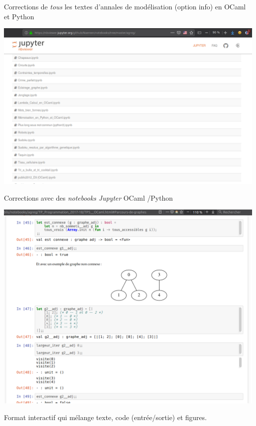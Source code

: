 \documentclass[11pt,english,ignorenonframetext,]{beamer}
\begin{document}
\begin{frame}[plain]{Corrections de \emph{tous} les textes d'annales de modélisation (\textcolor{info}{option info}) en OCaml et Python}

\centering
\includegraphics{figures/apercu_ENS_agreg_1.png}

\end{frame}

\begin{frame}[plain]{Corrections avec des \emph{notebooks Jupyter} OCaml /Python}

\centering
\includegraphics{figures/apercu_ENS_agreg_3.png}

Format interactif qui mélange texte, code (entrée/sortie) et figures.

\end{frame}
\end{document}
